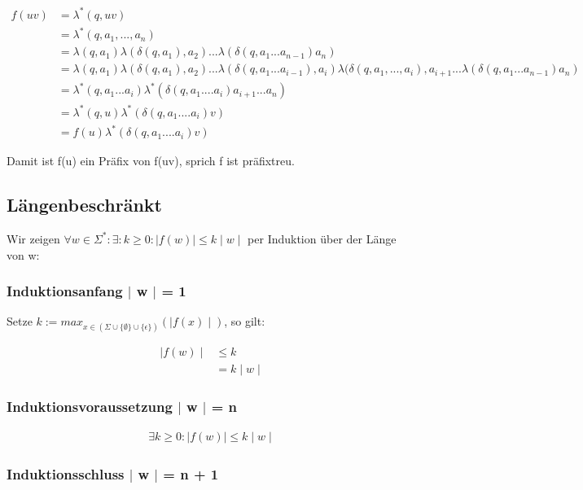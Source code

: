 \documentclass[12pt, a4paper]{article}
\begin{document}
\begin{align*}
f(uv) &= \lambda^*(q,uv) \\
&= \lambda^*(q, a_1,...,a_n) \\
&= \lambda(q,a_1) \lambda(\delta(q, a_1), a_2) ... \lambda(\delta(q,a_1...a_{n-1})a_n) \\
&= \lambda(q,a_1) \lambda(\delta(q, a_1), a_2) ... \lambda(\delta(q, a_1 ... a_{i-1}), a_i) \lambda(\delta(q, a_1,..., a_i), a_{i+1} ...  \lambda(\delta(q,a_1...a_{n-1})a_n) \\
&= \lambda^*(q,a_1 ... a_i) \lambda^*(\delta(q, a_1 .... a_i) a_{i+1} ... a_n) \\
&= \lambda^*(q,u) \lambda^*(\delta(q, a_1 .... a_i) v)\\
&= f(u) \lambda^*(\delta(q, a_1 .... a_i) v)
\end{align*}

Damit ist f(u) ein Präfix von f(uv), sprich f ist präfixtreu.

\subsection*{Längenbeschränkt}
Wir zeigen $\forall w \in \Sigma^*: \exists: k \ge 0: \mid f(w) \mid \le k \mid w \mid $ per Induktion über der Länge von w:

\subsubsection*{Induktionsanfang $\mid$ w $\mid$ = 1}
Setze $k := max_{x \in (\Sigma \cup \{ \emptyset \} \cup \{ \epsilon \})}( \mid f(x) \mid)$, so gilt:

\begin{align*}
\mid f(w) \mid &\le k \\
&= k \mid w \mid
\end{align*}

\subsubsection*{Induktionsvoraussetzung $\mid$ w $\mid$ = n}
\begin{align*}
\exists k \ge 0: \mid f(w) \mid \le k \mid w \mid
\end{align*}

\subsubsection*{Induktionsschluss $\mid$ w $\mid$ = n + 1}
\end{document}
